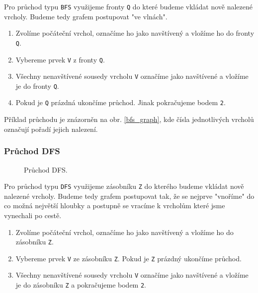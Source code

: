 \documentclass[12pt]{article}
\begin{document}
Pro průchod typu \texttt{BFS} využijeme fronty \texttt{Q} do které budeme vkládat nově nalezené vrcholy. Budeme tedy grafem postupovat "ve vlnách".

\begin{enumerate}
\setlength\itemsep{1px}
\item Zvolíme počáteční vrchol, označíme ho jako navštívený a vložíme ho do fronty \texttt{Q}.
\item Vybereme prvek \texttt{V} z fronty \texttt{Q}.
\item Všechny nenavštívené sousedy vrcholu \texttt{V} označíme jako navštívené a vložíme je do fronty \texttt{Q}.
\item Pokud je \texttt{Q} prázdná ukončíme průchod. Jinak pokračujeme bodem \texttt{2}.
\end{enumerate}

Příklad průchodu je znázorněn na obr. \ref{bfs_graph}, kde čísla jednotlivých vrcholů označují pořadí jejich nalezení.

\pagebreak
\subsubsection{Průchod DFS}
\label{DFS}

\begin{figure}
\vspace{-0.5cm}
\caption{Průchod DFS.}
\label{dfs_graph}
\end{figure}

Pro průchod typu \texttt{DFS} využijeme zásobníku \texttt{Z} do kterého budeme vkládat nově nalezené vrcholy. Budeme tedy grafem postupovat tak, že se nejprve "vnoříme" do co možná největší hloubky a postupně se vracíme k vrcholům které jsme vynechali po cestě.

\begin{enumerate}
\setlength\itemsep{1px}
\item Zvolíme počáteční vrchol, označíme ho jako navštívený a vložíme ho do zásobníku \texttt{Z}.
\item Vybereme prvek \texttt{V} ze zásobníku \texttt{Z}. Pokud je \texttt{Z} prázdný ukončíme průchod.
\item Všechny nenavštívené sousedy vrcholu \texttt{V} označíme jako navštívené a vložíme je do zásobníku \texttt{Z} a pokračujeme bodem \texttt{2}.
\end{enumerate}
\end{document}
